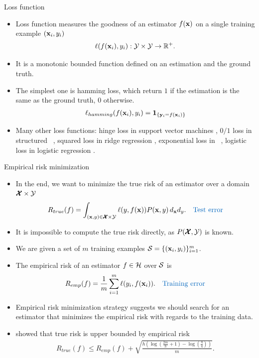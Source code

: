 \documentclass[first=dgreen,second=purple,logo=yellowexc]{aaltoslides}
\begin{document}
{\begin{frame}{Loss function}
	\begin{itemize}
		\item Loss function measures the goodness of an estimator $f(\mathbf {x})$ on a single training example $(\mathbf {x}_i,y_i)$
		\begin{align*}
			\ell(f(\mathbf {x}_i),y_i):\mathcal{Y}\times\mathcal{Y}\rightarrow\mathbb{R}^+.
		\end{align*}
		\item It is a monotonic bounded function defined on an estimation and the ground truth.
		\item The simplest one is hamming loss, which return $1$ if the estimation is the same as the ground truth, $0$ otherwise.
		\begin{align*}
			\ell_{hamming}(f(\mathbf {x}_i),y_i) = \mathbf{1}_{\{\mathbf {y}_i=f(\mathbf {x}_i)\}}
		\end{align*}
		\item Many other loss functions: {hinge loss} in support vector machines \citep{Cortes95support}, {$0/1$ loss} in structured \svm\ \citep{THJA04}, {squared loss} in ridge regression \citep{Hoerl00ridge}, {exponential loss} in \adaboost\ \citep{Schapire99improved}, {logistic loss} in logistic regression \citep{Chen99}.
	\end{itemize}
\end{frame}


\begin{frame}{Empirical risk minimization}
	\begin{itemize}
		\item In the end, we want to minimize the true risk of an estimator over a domain $\pmb {\mathcal{X}}\times\mathcal{Y}$
		\begin{align*}
			R_{true}(f) = \int_{(\vx,y)\in\vXcal\times\Ycal}\ell(y,f(\vx))P(\vx,y)\,d_{\vx}d_{y}. \quad\text{\color{aaltoblue} Test error}
		\end{align*}
		\item It is impossible to compute the true risk directly, as $P(\pmb {\mathcal{X}}, \mathcal{Y})$ is known.
		\item We are given a set of $m$ training examples $\mathcal{S}=\{(\mathbf {x}_i,y_i)\}_{i=1}^{m}$.
		\item The empirical risk of an estimator $f\in\mathcal{H}$ over $\mathcal{S}$ is
		\begin{align*}
			R_{emp}(f) = \frac{1}{m}\sum_{i=1}^m\ell(y_i,f(\vx_i)). \quad\text{\color{aaltoblue} Training error}
		\end{align*}
		\item Empirical risk minimization strategy \citep{Vapnik92principles} suggests we should search for an estimator that minimizes the empirical risk with regards to the training data.
		\item \citet{Vapnik92principles} showed that true risk is upper bounded by empirical risk
		\begin{align*}
			R_{true}(f) \le R_{emp}(f) + \sqrt{\frac{h(\log(\frac{2m}{h}+1)-\log(\frac{\eta}{4}))}{m}}.
		\end{align*}
	\end{itemize}
\end{frame}


}
\end{document}
